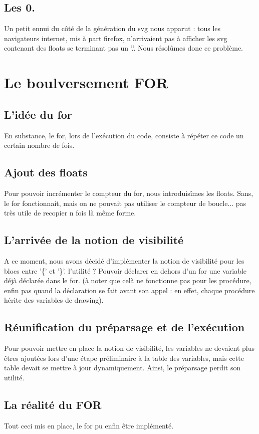\documentclass[11pt]{report} %
\begin{document}
\subsection{Les 0.}
Un petit ennui du côté de la génération du svg nous apparut : tous les navigateurs internet, mis à part firefox, n'arrivaient pas à afficher les svg contenant des floats se terminant pas un '.'. Nous résolûmes donc ce problème.

\section{Le boulversement FOR}
\subsection{L'idée du for}
En substance, le for, lors de l'exécution du code, consiste à répéter ce code un certain nombre de fois.
\subsection{Ajout des floats}
Pour pouvoir incrémenter le compteur du for, nous introduisîmes les floats. Sans, le for fonctionnait, mais on ne pouvait pas utiliser le compteur de boucle... pas très utile de recopier n fois là même forme.
\subsection{L'arrivée de la notion de visibilité}
A ce moment, nous avons décidé d'implémenter la notion de visibilité pour les blocs entre '\{' et '\}'. l'utilité ? Pouvoir déclarer en dehors d'un for une variable déjà déclarée dans le for. (à noter que celà ne fonctionne pas pour les procédure, enfin pas quand la déclaration se fait avant son appel : en effet, chaque procédure hérite des variables de drawing).
\subsection{Réunification du préparsage et de l'exécution}
Pour pouvoir mettre en place la notion de visibilité, les variables ne devaient plus êtres ajoutées lors d'une étape préliminaire à la table des variables, mais cette table devait se mettre à jour dynamiquement. Ainsi, le préparsage perdit son utilité.
\subsection{La réalité du FOR}
Tout ceci mis en place, le for pu enfin être implémenté.
\end{document}

